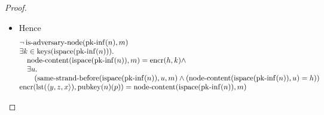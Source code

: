 \documentclass[11pt]{article}
\theoremstyle{plain}
\begin{document}
\begin{proof}
\begin{itemize}[leftmargin=2.8em, itemsep=4pt, parsep=1pt]
\begin{itemize}[leftmargin=2.8em, itemsep=4pt, parsep=1pt]
  \item[\textbf{224--231}] Hence 
\begin{equation*}
\begin{array}{@{}l@{}}
\neg \operatorname{is\text{-}adversary\text{-}node}(\operatorname{pk\text{-}inf}(n), m) \\
\begin{array}{@{}l@{}} \exists k \in \operatorname{keys}(\operatorname{ispace}(\operatorname{pk\text{-}inf}(n))). \\ \quad \operatorname{node\text{-}content}(\operatorname{ispace}(\operatorname{pk\text{-}inf}(n)), m) = \operatorname{encr}(h, k) \wedge \\ \quad \exists u. \\ \quad \quad (\operatorname{same\text{-}strand\text{-}before}(\operatorname{ispace}(\operatorname{pk\text{-}inf}(n)), u, m) \wedge (\operatorname{node\text{-}content}(\operatorname{ispace}(\operatorname{pk\text{-}inf}(n)), u) = h)) \end{array} \\
\operatorname{encr}(\operatorname{lst}(\langle y, z, x \rangle), \operatorname{pubkey}(n)(p)) = \operatorname{node\text{-}content}(\operatorname{ispace}(\operatorname{pk\text{-}inf}(n)), m) \\

\end{array}
\end{equation*}
\end{itemize}
\end{itemize}
\end{proof}
\end{document}
